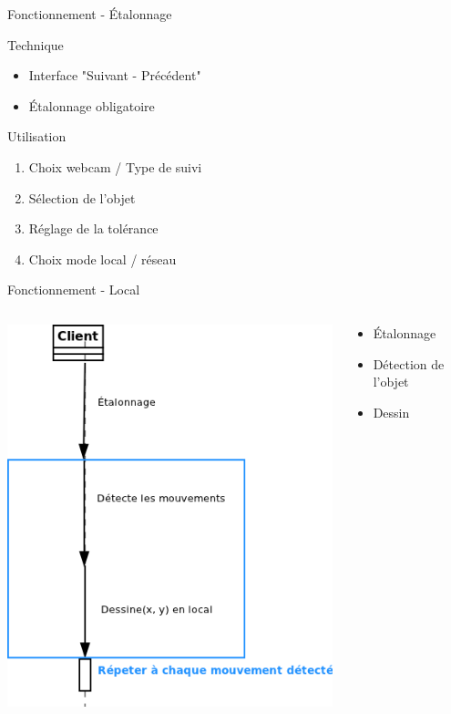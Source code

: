 \documentclass{beamer}
\begin{document}
		\begin{frame}{Fonctionnement - Étalonnage}
			\begin{block}{Technique}
				\begin{itemize}
					\item Interface "Suivant - Précédent"
					\item Étalonnage obligatoire
				\end{itemize}
			\end{block}
			\begin{block}{Utilisation}
				\begin{enumerate}
					\item Choix webcam / Type de suivi
					\item Sélection de l'objet
					\item Réglage de la tolérance
					\item Choix mode local / réseau
				\end{enumerate}
			\end{block}
			
		\end{frame}
		
		\begin{frame}{Fonctionnement - Local}
			\begin{columns}
				\begin{column}{5cm}
					\includegraphics[scale=0.45]{sequence_local.png}
				\end{column}
				\begin{column}{3cm}
					\begin{itemize}
						\item Étalonnage
						\item Détection de l'objet
						\item Dessin
					\end{itemize}
				\end{column}
			\end{columns}
		\end{frame}
		
\end{document}
